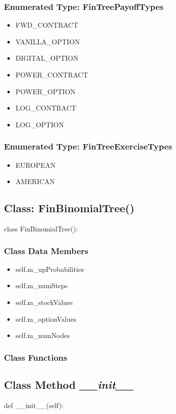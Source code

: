 \documentclass[twoside,11pt]{book}
\begin{document}
\subsubsection{Enumerated Type: FinTreePayoffTypes}
\begin{itemize}
\item{FWD\_CONTRACT}
\item{VANILLA\_OPTION}
\item{DIGITAL\_OPTION}
\item{POWER\_CONTRACT}
\item{POWER\_OPTION}
\item{LOG\_CONTRACT}
\item{LOG\_OPTION}
\end{itemize}

\subsubsection{Enumerated Type: FinTreeExerciseTypes}
\begin{itemize}
\item{EUROPEAN}
\item{AMERICAN}
\end{itemize}

\subsection{Class: FinBinomialTree()}
class FinBinomialTree():

\subsubsection{Class Data Members}
\begin{itemize}
\item{self.m\_upProbabilities}
\item{self.m\_numSteps}
\item{self.m\_stockValues}
\item{self.m\_optionValues}
\item{self.m\_numNodes}
\end{itemize}

\subsubsection{Class Functions}

\subsection{Class Method {\it \_\_init\_\_}}
def \_\_init\_\_(self):
\end{document}
